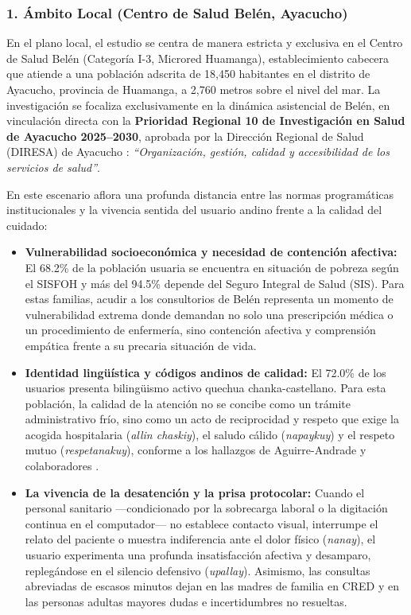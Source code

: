 \subsubsection*{1. Ámbito Local (Centro de Salud Belén, Ayacucho)}
En el plano local, el estudio se centra de manera estricta y exclusiva en el Centro de Salud Belén (Categoría I-3, Microred Huamanga), establecimiento cabecera que atiende a una población adscrita de 18,450 habitantes en el distrito de Ayacucho, provincia de Huamanga, a 2,760 metros sobre el nivel del mar. La investigación se focaliza exclusivamente en la dinámica asistencial de Belén, en vinculación directa con la \textbf{Prioridad Regional 10 de Investigación en Salud de Ayacucho 2025–2030}, aprobada por la Dirección Regional de Salud (DIRESA) de Ayacucho \cite{diresa2025}: \textit{“Organización, gestión, calidad y accesibilidad de los servicios de salud”}.

En este escenario aflora una profunda distancia entre las normas programáticas institucionales y la vivencia sentida del usuario andino frente a la calidad del cuidado:
\begin{itemize}
    \item \textbf{Vulnerabilidad socioeconómica y necesidad de contención afectiva:} El 68.2\% de la población usuaria se encuentra en situación de pobreza según el SISFOH y más del 94.5\% depende del Seguro Integral de Salud (SIS). Para estas familias, acudir a los consultorios de Belén representa un momento de vulnerabilidad extrema donde demandan no solo una prescripción médica o un procedimiento de enfermería, sino contención afectiva y comprensión empática frente a su precaria situación de vida.
    \item \textbf{Identidad lingüística y códigos andinos de calidad:} El 72.0\% de los usuarios presenta bilingüismo activo quechua chanka-castellano. Para esta población, la calidad de la atención no se concibe como un trámite administrativo frío, sino como un acto de reciprocidad y respeto que exige la acogida hospitalaria (\textit{allin chaskiy}), el saludo cálido (\textit{napaykuy}) y el respeto mutuo (\textit{respetanakuy}), conforme a los hallazgos de Aguirre-Andrade y colaboradores \cite{aguirre2020}.
    \item \textbf{La vivencia de la desatención y la prisa protocolar:} Cuando el personal sanitario —condicionado por la sobrecarga laboral o la digitación continua en el computador— no establece contacto visual, interrumpe el relato del paciente o muestra indiferencia ante el dolor físico (\textit{nanay}), el usuario experimenta una profunda insatisfacción afectiva y desamparo, replegándose en el silencio defensivo (\textit{upallay}). Asimismo, las consultas abreviadas de escasos minutos dejan en las madres de familia en CRED y en las personas adultas mayores dudas e incertidumbres no resueltas.
\end{itemize}

